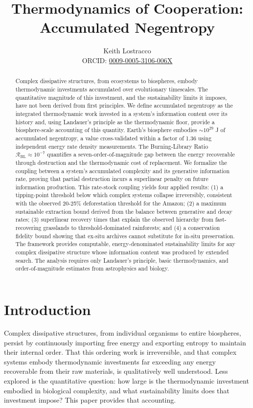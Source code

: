 \documentclass[11pt]{article}
\title{Thermodynamics of Cooperation: Accumulated Negentropy}
\author{%
Keith Lostracco%
\\[0.25em]{\normalsize ORCID: \href{https://orcid.org/0009-0005-3106-006X}{0009-0005-3106-006X}}%
}
\date{}
\theoremstyle{plain}
\theoremstyle{definition}
\theoremstyle{remark}
\let\origsection\section
\renewcommand{\section}{\needspace{12\baselineskip}\origsection}
\begin{document}
\maketitle

\begin{abstract}
Complex dissipative structures, from ecosystems to biospheres, embody
thermodynamic investments accumulated over evolutionary timescales. The
quantitative magnitude of this investment, and the sustainability limits
it imposes, have not been derived from first principles. We define
accumulated negentropy as the integrated thermodynamic work invested in
a system's information content over its history and, using Landauer's
principle as the thermodynamic floor, provide a biosphere-scale
accounting of this quantity. Earth's biosphere embodies \(\sim 10^{29}\)
J of accumulated negentropy, a value cross-validated within a factor of
1.36 using independent energy rate density measurements. The
Burning-Library Ratio \(\mathcal{R}_{\text{BL}} \approx 10^{-7}\)
quantifies a seven-order-of-magnitude gap between the energy recoverable
through destruction and the thermodynamic cost of replacement. We
formalize the coupling between a system's accumulated complexity and its
generative information rate, proving that partial destruction incurs a
superlinear penalty on future information production. This rate-stock
coupling yields four applied results: (1) a tipping-point threshold
below which complex systems collapse irreversibly, consistent with the
observed 20-25\% deforestation threshold for the Amazon; (2) a maximum
sustainable extraction bound derived from the balance between generative
and decay rates; (3) superlinear recovery times that explain the
observed hierarchy from fast-recovering grasslands to
threshold-dominated rainforests; and (4) a conservation fidelity bound
showing that ex-situ archives cannot substitute for in-situ
preservation. The framework provides computable, energy-denominated
sustainability limits for any complex dissipative structure whose
information content was produced by extended search. The analysis
requires only Landauer's principle, basic thermodynamics, and
order-of-magnitude estimates from astrophysics and biology.
\end{abstract}
\section{Introduction}\label{introduction}

Complex dissipative structures, from individual organisms to entire
biospheres, persist by continuously importing free energy and exporting
entropy to maintain their internal order. That this ordering work is
irreversible, and that complex systems embody thermodynamic investments
far exceeding any energy recoverable from their raw materials, is
qualitatively well understood. Less explored is the quantitative
question: how large is the thermodynamic investment embodied in
biological complexity, and what sustainability limits does that
investment impose? This paper provides that accounting.
\end{document}
